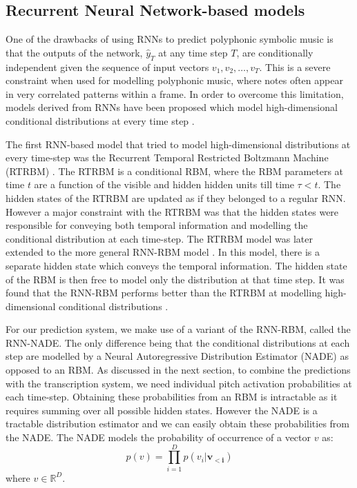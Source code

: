 	\subsection{Recurrent Neural Network-based models}
	\label{subsec:rnn-based}
	One of the drawbacks of using RNNs to predict polyphonic symbolic music is that the outputs of the network, $\hat{y}_T$ at any time step $T$,  are conditionally independent given the sequence of input vectors $v_1, v_2, \ldots, v_T$. This is a severe constraint when used for modelling polyphonic music, where notes often appear in very correlated patterns within a frame. In order to overcome this limitation, models derived from RNNs have been proposed which model high-dimensional conditional distributions at every time step \cite{sutskever2008recurrent,Boulanger-Lewandowski2012}.

	The first RNN-based model that tried to model high-dimensional distributions at every time-step was the Recurrent Temporal Restricted Boltzmann Machine (RTRBM) \cite{sutskever2008recurrent}. The RTRBM is a conditional RBM, where the RBM parameters at time  $t$ are a function of the visible and hidden hidden units till time $\tau < t$. The hidden states of the RTRBM are updated as if they belonged to a regular RNN. However a major constraint with the RTRBM was that the hidden states were responsible for conveying both temporal information and modelling the conditional distribution at each time-step. The RTRBM model was later extended to the more general RNN-RBM model \cite{Boulanger-Lewandowski2012}. In this model, there is a separate hidden state which conveys the temporal information. The hidden state of the RBM is then free to model only the distribution at that time step. It was found that the RNN-RBM performs better than the RTRBM at modelling high-dimensional conditional distributions \cite{Boulanger-Lewandowski2012}. 

	For our prediction system, we make use of a variant of the RNN-RBM, called the RNN-NADE. The only difference being that the conditional distributions at each step are modelled by a Neural Autoregressive Distribution Estimator (NADE) \cite{Larochelle2011} as opposed to an RBM. As discussed in the next section, to combine the predictions with the transcription system, we need individual pitch activation probabilities at each time-step. Obtaining these probabilities from an RBM is intractable as it requires summing over all possible hidden states. However the NADE is a tractable distribution estimator and we can easily obtain these probabilities from the NADE. The NADE models the probability of occurrence of a vector $v$ as: 
	\begin{equation}
		p(v) = \prod_{i=1}^D p(v_i|\mathbf{v_{<i}})
	\end{equation}
	where $ v \in \mathbb{R}^{D}$.
	
